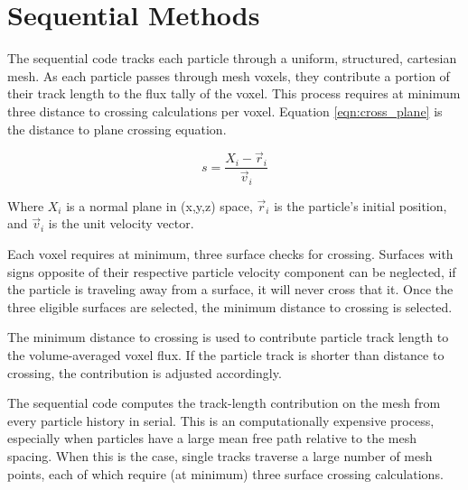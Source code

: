 \section{Sequential Methods}

The sequential code tracks each particle through a uniform, structured,
cartesian mesh. As each particle passes through mesh voxels, they contribute a
portion of their track length to the flux tally of the voxel. This process
requires at minimum three distance to crossing calculations per voxel. Equation
\ref{eqn:cross_plane} is the distance to plane crossing equation.

\begin{equation}
\label{eqn:cross_plane}
s = \frac{X_i - \vec{r}_i}{\vec{v}_i}
\end{equation}

Where $X_i$ is a normal plane in (x,y,z) space, $\vec{r}_i$ is the particle's
initial position, and $\vec{v}_i$ is the unit velocity vector.

Each voxel requires at minimum, three surface checks for crossing. Surfaces with
signs opposite of their respective particle velocity component can be neglected,
if the particle is traveling away from a surface, it will never cross that it.
Once the three eligible surfaces are selected, the minimum distance to crossing
is selected. 

The minimum distance to crossing is used to contribute particle track length to
the volume-averaged voxel flux. If the particle track is shorter than distance
to crossing, the contribution is adjusted accordingly.

The sequential code computes the track-length contribution on the mesh from
every particle history in serial. This is an computationally expensive process,
especially when particles have a large mean free path relative to the mesh
spacing. When this is the case, single tracks traverse a large number of mesh
points, each of which require (at minimum) three surface crossing calculations.


